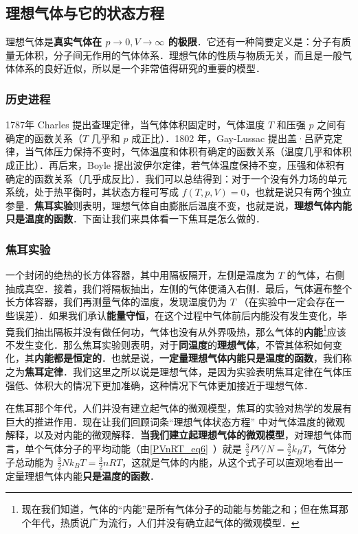 

\subsection{理想气体与它的状态方程}

理想气体是\textbf{真实气体在 $p\rightarrow 0,V\rightarrow \infty$ 的极限}．它还有一种简要定义是：分子有质量无体积，分子间无作用的气体体系．理想气体的性质与物质无关，而且是一般气体体系的良好近似，所以是一个非常值得研究的重要的模型．
\subsubsection{历史进程}
1787年 Charles 提出查理定律，当气体体积固定时，气体温度 $T$ 和压强 $p$ 之间有确定的函数关系（$T$ 几乎和 $p$ 成正比）．1802 年，Gay-Lussac 提出盖·吕萨克定律，当气体压力保持不变时，气体温度和体积有确定的函数关系（温度几乎和体积成正比）．再后来，Boyle 提出波伊尔定律，若气体温度保持不变，压强和体积有确定的函数关系（几乎成反比）．我们可以总结得到：对于一个没有外力场的单元系统，处于热平衡时，其状态方程可写成 $f(T,p,V)=0$，也就是说只有两个独立参量．\textbf{焦耳实验}则表明，理想气体自由膨胀后温度不变，也就是说，\textbf{理想气体内能只是温度的函数}．下面让我们来具体看一下焦耳是怎么做的．
\subsubsection{焦耳实验}
一个封闭的绝热的长方体容器，其中用隔板隔开，左侧是温度为 $T$ 的气体，右侧抽成真空．接着，我们将隔板抽出，左侧的气体便涌入右侧．最后，气体遍布整个长方体容器，我们再测量气体的温度，发现温度仍为 $T$ （在实验中一定会存在一些误差）．如果我们承认\textbf{能量守恒}，在这个过程中气体前后内能没有发生变化，毕竟我们抽出隔板并没有做任何功，气体也没有从外界吸热，那么气体的\textbf{内能}\footnote{现在我们知道，气体的“内能”是所有气体分子的动能与势能之和；但在焦耳那个年代，热质说广为流行，人们并没有确立起气体的微观模型．}应该不发生变化．那么焦耳实验则表明，对于\textbf{同温度}的\textbf{理想气体}，不管其体积如何变化，其\textbf{内能都是恒定的}．也就是说，\textbf{一定量理想气体内能只是温度的函数}，我们称之为\textbf{焦耳定律}．我们这里之所以说是理想气体，是因为实验表明焦耳定律在气体压强低、体积大的情况下更加准确，这种情况下气体更加接近于理想气体．

在焦耳那个年代，人们并没有建立起气体的微观模型，焦耳的实验对热学的发展有巨大的推进作用．现在让我们回顾词条“理想气体状态方程” 中对气体温度的微观解释，以及对内能的微观解释．\textbf{当我们建立起理想气体的微观模型}，对理想气体而言，单个气体分子的平均动能（由\autoref{PVnRT_eq6}~）就是 $\frac{3}{2}PV/N = \frac{3}{2}k_B T$，气体分子总动能为 $\frac{3}{2}N k_B T=\frac{3}{2}nRT$，这就是气体的内能，从这个式子可以直观地看出一定量理想气体内能\textbf{只是温度的函数}．

